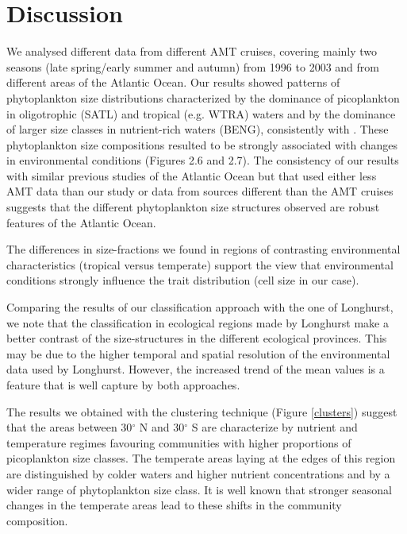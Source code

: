 \section{Discussion}
We analysed different data from different AMT cruises, covering mainly two seasons (late spring/early summer and autumn) from 1996 to 2003 and from different areas of the Atlantic Ocean. Our results showed patterns of phytoplankton size distributions characterized by the dominance of picoplankton in oligotrophic (SATL) and tropical (e.g. WTRA) waters and by the dominance of larger size classes in nutrient-rich waters (BENG), consistently with \citet{Maranon2000, Maranon2001, Poulton2006, Moreno-Ostos2011, Huete-Ortega2011}. These phytoplankton size compositions resulted to be strongly associated with changes in environmental conditions (Figures 2.6 and 2.7). The consistency of our results with similar previous studies of the Atlantic Ocean but that used either less AMT data than our study \citep{Maranon2000, Maranon2001, Poulton2006} or data from sources different than the AMT cruises \citep{Moreno-Ostos2011, Huete-Ortega2011} suggests that the different phytoplankton size structures observed are robust features of the Atlantic Ocean. 

The differences in size-fractions we found in regions of contrasting environmental characteristics (tropical versus temperate) support the view \citep{Messier2010} that environmental conditions strongly influence the trait distribution (cell size in our case). 

Comparing the results of our classification approach with the one of Longhurst, we note that the classification in ecological regions made by Longhurst make a better contrast of the size-structures in the different ecological provinces. This may be due to the higher temporal and spatial resolution of the environmental data used by Longhurst. However, the increased trend of the mean values is a feature that is well capture by both approaches.

The results we obtained with the clustering technique (Figure \ref{clusters}) suggest that the areas between 30$^\circ$ N and 30$^\circ$ S are characterize by nutrient and temperature regimes favouring communities with higher proportions of picoplankton size classes. The temperate areas laying at the edges of this region are distinguished by colder waters and higher nutrient concentrations and by a wider range of phytoplankton size class. It is well known that stronger seasonal changes in the temperate areas lead to these shifts in the community composition. 

